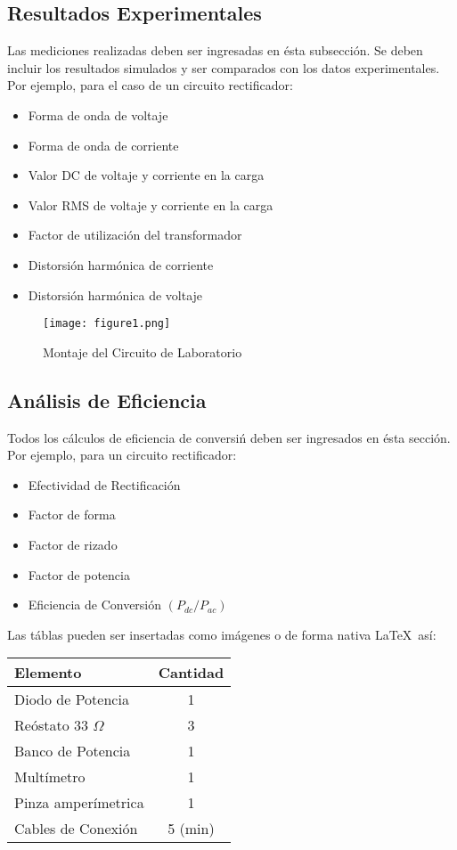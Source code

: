 \documentclass[letterpaper, 12pt]{report}
\begin{document}
\subsection{Resultados Experimentales}
Las mediciones realizadas deben ser ingresadas en \'esta subsecci\'on. Se deben incluir los resultados simulados y ser comparados con los datos experimentales. Por ejemplo, para el caso de un circuito rectificador: 

\begin{itemize}[leftmargin=1.8cm]
  \item Forma de onda de voltaje
  \item Forma de onda de corriente
  \item Valor DC de voltaje y corriente en la carga
  \item Valor RMS de voltaje y corriente en la carga
  \item Factor de utilizaci\'on del transformador
  \item Distorsi\'on harm\'onica de corriente
  \item Distorsi\'on harm\'onica de voltaje
\end{itemize} 

\begin{figure}
\centering
\texttt{[image: figure1.png]}
	\label{fig:1}
	\caption{Montaje del Circuito de Laboratorio}
\end{figure}

\subsection{An\'alisis de Eficiencia}
Todos los c\'alculos de eficiencia de conversi\'n deben ser ingresados en \'esta secci\'on. Por ejemplo, para un circuito rectificador: 

\begin{itemize}[leftmargin=1.8cm]
  \item Efectividad de Rectificaci\'on
  \item Factor de forma
  \item Factor de rizado
  \item Factor de potencia
  \item Eficiencia de Conversi\'on $(P_{dc}/P_{ac})$
\end{itemize}

Las t\'ablas pueden ser insertadas como im\'agenes o de forma nativa \LaTeX\ as\'i: 

\begin{center}
\begin{tabular}{| l | c |}
 \hline
 \textbf{Elemento} & \textbf{Cantidad}  \\ 
 \hline
 Diodo de Potencia & 1  \\  
 Re\'ostato 33 $\Omega$ & 3 \\
 Banco de Potencia & 1 \\
 Mult\'imetro & 1 \\
 Pinza amper\'imetrica & 1 \\
 Cables de Conexi\'on & 5 (min) \\
 \hline
\end{tabular}
\end{center}
\end{document}
